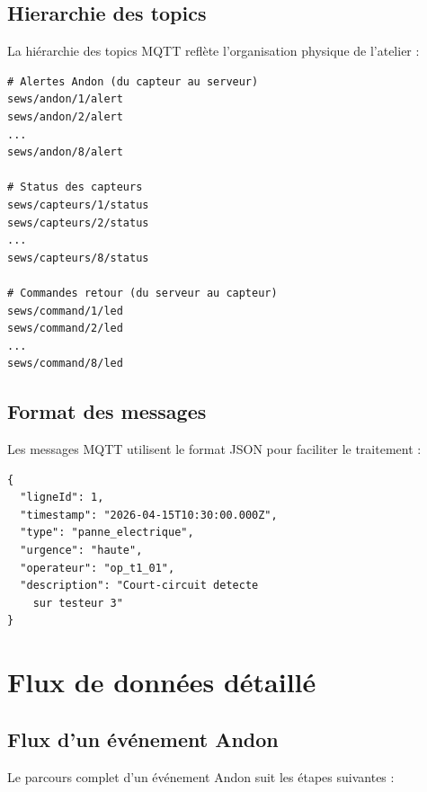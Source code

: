 \subsection{Hierarchie des topics}

La hi\'erarchie des topics MQTT refl\`ete l'organisation physique de l'atelier :

\begin{lstlisting}[caption={Hi\'erarchie des topics MQTT},label={lst:topics_hierarchie}]
# Alertes Andon (du capteur au serveur)
sews/andon/1/alert
sews/andon/2/alert
...
sews/andon/8/alert

# Status des capteurs
sews/capteurs/1/status
sews/capteurs/2/status
...
sews/capteurs/8/status

# Commandes retour (du serveur au capteur)
sews/command/1/led
sews/command/2/led
...
sews/command/8/led
\end{lstlisting}

\subsection{Format des messages}

Les messages MQTT utilisent le format JSON pour faciliter le traitement :

\begin{lstlisting}[caption={Format du message d'alerte Andon},label={lst:message_format}]
{
  "ligneId": 1,
  "timestamp": "2026-04-15T10:30:00.000Z",
  "type": "panne_electrique",
  "urgence": "haute",
  "operateur": "op_t1_01",
  "description": "Court-circuit detecte 
    sur testeur 3"
}
\end{lstlisting}

\section{Flux de donn\'ees d\'etaill\'e}

\subsection{Flux d'un \'ev\'enement Andon}

Le parcours complet d'un \'ev\'enement Andon suit les \'etapes suivantes :

